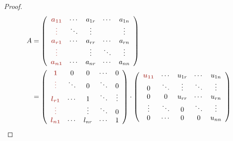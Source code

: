 \begin{proof}
    $$\displaystyle \begin{aligned} A & =\left(\begin{array}{ c c c c c }
                \boldsymbol{\textcolor[rgb]{0.72,0.33,0.31}{a_{11}}}  & \cdots & a_{1r} & \cdots & a_{1n} \\
                \boldsymbol{\textcolor[rgb]{0.72,0.33,0.31}{\vdots }} & \ddots & \vdots &        & \vdots \\
                \boldsymbol{\textcolor[rgb]{0.72,0.33,0.31}{a_{r1}}}  & \cdots & a_{rr} & \cdots & a_{rn} \\
                \boldsymbol{\textcolor[rgb]{0.72,0.33,0.31}{\vdots }} &        & \vdots & \ddots & \vdots \\
                \boldsymbol{\textcolor[rgb]{0.72,0.33,0.31}{a_{n1}}}  & \cdots & a_{nr} & \cdots & a_{nn}
            \end{array}\right)                                               \\
                  & =\left(\begin{array}{ c c c c c }
                \boldsymbol{\textcolor[rgb]{0.72,0.33,0.31}{1}}       & 0      & 0      & \cdots & 0      \\
                \boldsymbol{\textcolor[rgb]{0.72,0.33,0.31}{\vdots }} & \ddots & 0      & \ddots & 0      \\
                \boldsymbol{\textcolor[rgb]{0.72,0.33,0.31}{l_{r1}}}  & \cdots & 1      & \ddots & \vdots \\
                \boldsymbol{\textcolor[rgb]{0.72,0.33,0.31}{\vdots }} &        & \vdots & \ddots & 0      \\
                \boldsymbol{\textcolor[rgb]{0.72,0.33,0.31}{l_{n1}}}  & \cdots & l_{nr} & \cdots & 1
            \end{array}\right) \cdot \left(\begin{array}{ c c c c c }
                \boldsymbol{\textcolor[rgb]{0.72,0.33,0.31}{u_{11}}} & \cdots & u_{1r} & \cdots & u_{1n} \\
                0                                                    & \ddots & \vdots & \ddots & \vdots \\
                0                                                    & 0      & u_{rr} & \cdots & u_{rn} \\
                \vdots                                               & \ddots & 0      & \ddots & \vdots \\
                0                                                    & \cdots & 0      & 0      & u_{nn}
            \end{array}\right)
        \end{aligned}$$
\end{proof}


